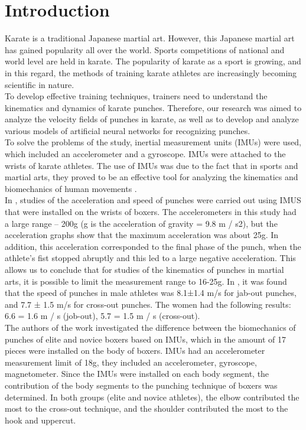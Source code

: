 \documentclass[sport,article,submit,moreauthors,pdftex]{Definitions/mdpi}
\begin{document}
\section{Introduction}
Karate is a traditional Japanese martial art. However, this Japanese martial art has gained popularity all over the world. Sports competitions of national and world level are held in karate. The popularity of karate as a sport is growing, and in this regard, the methods of training karate athletes are increasingly becoming scientific in nature.\\
To develop effective training techniques, trainers need to understand the kinematics and dynamics of karate punches. Therefore, our research was aimed to analyze the velocity fields of punches in karate, as well as to develop and analyze various models of artificial neural networks for recognizing punches.\\
To solve the problems of the study, inertial measurement units (IMUs) were used, which included an accelerometer and a gyroscope. IMUs were attached to the wrists of karate athletes. The use of IMUs was due to the fact that in sports and martial arts, they proved to be an effective tool for analyzing the kinematics and biomechanics of human movements \cite{ref-journal1, ref-journal2}.\\
In \cite{ref-journal3}, studies of the acceleration and speed of punches were carried out using IMUS that were installed on the wrists of boxers. The accelerometers in this study had a large range – 200g (g is the acceleration of gravity = 9.8 m / s2), but the acceleration graphs show that the maximum acceleration was about 25g. In addition, this acceleration corresponded to the final phase of the punch, when the athlete's fist stopped abruptly and this led to a large negative acceleration. This allows us to conclude that for studies of the kinematics of punches in martial arts, it is possible to limit the measurement range to 16-25g. In \cite{ref-journal3}, it was found that the speed of punches in male athletes was 8.1±1.4 m/s for jab-out punches, and 7.7 ± 1.5 m/s for cross-out punches. The women had the following results: 6.6 = 1.6 m / s (job-out), 5.7 = 1.5 m / s (cross-out).\\
The authors of the work \cite{ref-journal4} investigated the difference between the biomechanics of punches of elite and novice boxers based on IMUs, which in the amount of 17 pieces were installed on the body of boxers. IMUs had an accelerometer measurement limit of 18g, they included an accelerometer, gyroscope, magnetometer. Since the IMUs were installed on each body segment, the contribution of the body segments to the punching technique of boxers was determined. In both groups (elite and novice athletes), the elbow contributed the most to the cross-out technique, and the shoulder contributed the most to the hook and uppercut.\\
\end{document}
